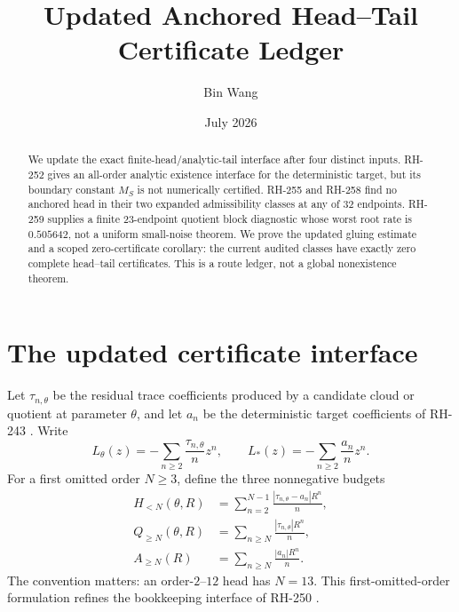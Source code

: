 \documentclass[11pt]{article}
\title{Updated Anchored Head--Tail Certificate Ledger}
\author{Bin Wang}
\date{July 2026}
\theoremstyle{definition}
\theoremstyle{remark}
\begin{document}
\maketitle

\begin{abstract}
We update the exact finite-head/analytic-tail interface after four distinct
inputs.  RH-252 gives an all-order analytic existence interface for the
deterministic target, but its boundary constant $M_S$ is not numerically
certified.  RH-255 and RH-258 find no anchored head in their two expanded
admissibility classes at any of 32 endpoints.  RH-259 supplies a finite 23-endpoint
quotient block diagnostic whose worst root rate is $0.505642$, not a uniform
small-noise theorem.  We prove the updated gluing estimate and a scoped
zero-certificate corollary: the current audited classes have exactly zero
complete head--tail certificates.  This is a route ledger, not a global
nonexistence theorem.
\end{abstract}

\section{The updated certificate interface}

Let $\tau_{n,\theta}$ be the residual trace coefficients produced by a
candidate cloud or quotient at parameter $\theta$, and let $a_n$ be the
deterministic target coefficients of RH-243 \citep{WangRH243}.  Write
\begin{equation}
 L_\theta(z)=-\sum_{n\ge 2}\frac{\tau_{n,\theta}}{n}z^n,
 \qquad
 L_*(z)=-\sum_{n\ge 2}\frac{a_n}{n}z^n.
 \label{eq:logs}
\end{equation}
For a first omitted order $N\ge 3$, define the three nonnegative budgets
\begin{align}
 H_{<N}(\theta,R)&=\sum_{n=2}^{N-1}
     \frac{|\tau_{n,\theta}-a_n|R^n}{n},\\
 Q_{\ge N}(\theta,R)&=\sum_{n\ge N}
     \frac{|\tau_{n,\theta}|R^n}{n},\\
 A_{\ge N}(R)&=\sum_{n\ge N}
     \frac{|a_n|R^n}{n}.
 \label{eq:budgets}
\end{align}
The convention matters: an order-$2$--$12$ head has $N=13$.
This first-omitted-order formulation refines the bookkeeping interface of
RH-250 \citep{WangRH250}.
\end{document}
